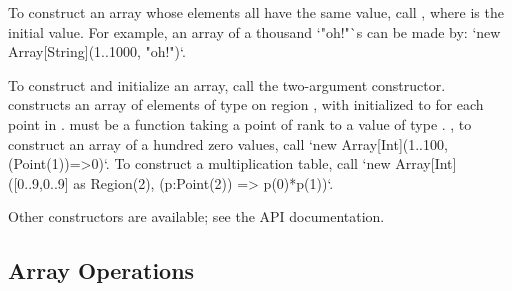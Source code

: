 To construct an array whose elements all have the same value, call
, where  is the initial value. 
For example, an array of a thousand \xcd`"oh!"`s can be made by:
\xcd`new Array[String](1..1000, "oh!")`.

To construct and initialize an array, call the two-argument constructor. 
 constructs an array of elements of type  on
region , with  initialized to  for each point
 in .   must be a function taking a point of rank
 to a value of type .  \Eg, to construct an array of a
hundred zero values, call
\xcd`new Array[Int](1..100, (Point(1))=>0)`. 
To construct a multiplication table, call
\xcd`new Array[Int]([0..9,0..9] as Region(2), (p:Point(2)) => p(0)*p(1))`.

Other constructors are available; see the API documentation.

\subsection{Array Operations}

